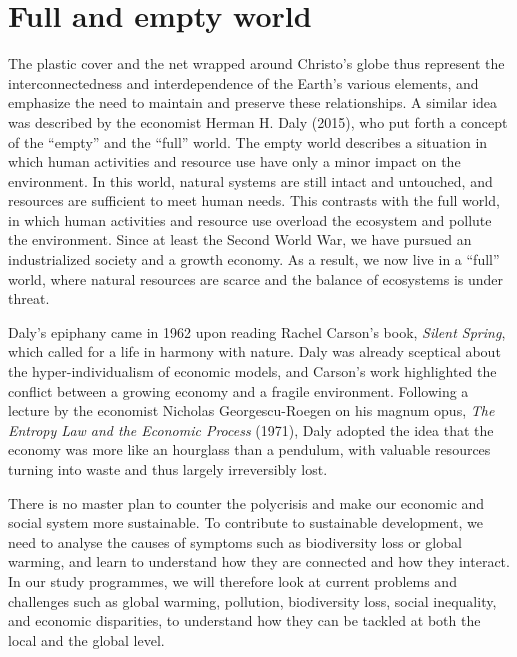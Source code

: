 \documentclass[
  a4paper,
  openany]{book}
\begin{document}
\section*{Full and empty world}\label{full-and-empty-world}


The plastic cover and the net wrapped around Christo's globe thus
represent the interconnectedness and interdependence of the Earth's
various elements, and emphasize the need to maintain and preserve these
relationships. A similar idea was described by the economist Herman H.
Daly (2015), who put forth a concept of the ``empty'' and the ``full''
world. The empty world describes a situation in which human activities
and resource use have only a minor impact on the environment. In this
world, natural systems are still intact and untouched, and resources are
sufficient to meet human needs. This contrasts with the full world, in
which human activities and resource use overload the ecosystem and
pollute the environment. Since at least the Second World War, we have
pursued an industrialized society and a growth economy. As a result, we
now live in a ``full'' world, where natural resources are scarce and the
balance of ecosystems is under threat.

Daly's epiphany came in 1962 upon reading Rachel Carson's book,
\emph{Silent Spring}, which called for a life in harmony with nature.
Daly was already sceptical about the hyper-individualism of economic
models, and Carson's work highlighted the conflict between a growing
economy and a fragile environment. Following a lecture by the economist
Nicholas Georgescu-Roegen on his magnum opus, \emph{The Entropy Law and
the Economic Process} (1971), Daly adopted the idea that the economy was
more like an hourglass than a pendulum, with valuable resources turning
into waste and thus largely irreversibly lost.

There is no master plan to counter the polycrisis and make our economic
and social system more sustainable. To contribute to sustainable
development, we need to analyse the causes of symptoms such as
biodiversity loss or global warming, and learn to understand how they
are connected and how they interact. In our study programmes, we will
therefore look at current problems and challenges such as global
warming, pollution, biodiversity loss, social inequality, and economic
disparities, to understand how they can be tackled at both the local and
the global level.
\end{document}
